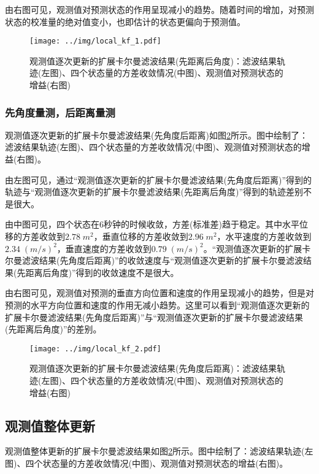 \documentclass[12pt, onecolumn]{article}
\newcommand\normf{\fangsong}
\begin{document}
	由右图可见，观测值对预测状态的作用呈现减小的趋势。随着时间的增加，对预测状态的校准量的绝对值变小，也即估计的状态更偏向于预测值。
	
			\begin{figure}[h]
				\centering
				\texttt{[image: ../img/local\_kf\_1.pdf]}
				\caption{\normf 观测值逐次更新的扩展卡尔曼滤波结果(先距离后角度)：滤波结果轨迹(左图)、四个状态量的方差收敛情况(中图)、观测值对预测状态的增益(右图)}
				\label{fig:local_kf_1}
			\end{figure}
		
	\subsubsection{\normf 先角度量测，后距离量测}
		
		观测值逐次更新的扩展卡尔曼滤波结果(先角度后距离)如图\ref{fig:local_kf_2}所示。图中绘制了：滤波结果轨迹(左图)、四个状态量的方差收敛情况(中图)、观测值对预测状态的增益(右图)。
			
		由左图可见，通过“观测值逐次更新的扩展卡尔曼滤波结果(先角度后距离)”得到的轨迹与“观测值逐次更新的扩展卡尔曼滤波结果(先距离后角度)”得到的轨迹差别不是很大。
		
		由中图可见，四个状态在6秒钟的时候收敛，方差(标准差)趋于稳定。其中水平位移的方差收敛到$2.78\;m^2$，垂直位移的方差收敛到$2.96\;m^2$，水平速度的方差收敛到$2.34\;(m/s)^2$，垂直速度的方差收敛到$0.79\;(m/s)^2$。“观测值逐次更新的扩展卡尔曼滤波结果(先角度后距离)”的收敛速度与“观测值逐次更新的扩展卡尔曼滤波结果(先距离后角度)”得到的收敛速度不是很大。
		
		由右图可见，观测值对预测的垂直方向位置和速度的作用呈现减小的趋势，但是对预测的水平方向位置和速度的作用无减小趋势。这里可以看到“观测值逐次更新的扩展卡尔曼滤波结果(先角度后距离)”与“观测值逐次更新的扩展卡尔曼滤波结果(先距离后角度)”的差别。
		
				\begin{figure}[h]
					\centering
					\texttt{[image: ../img/local\_kf\_2.pdf]}
					\caption{\normf 观测值逐次更新的扩展卡尔曼滤波结果(先角度后距离)：滤波结果轨迹(左图)、四个状态量的方差收敛情况(中图)、观测值对预测状态的增益(右图)}
					\label{fig:local_kf_2}
				\end{figure}
		
	\subsection{\normf 观测值整体更新}

	
		观测值整体更新的扩展卡尔曼滤波结果如图\ref{fig:local_kf_2}所示。图中绘制了：滤波结果轨迹(左图)、四个状态量的方差收敛情况(中图)、观测值对预测状态的增益(右图)。
			
\end{document}
